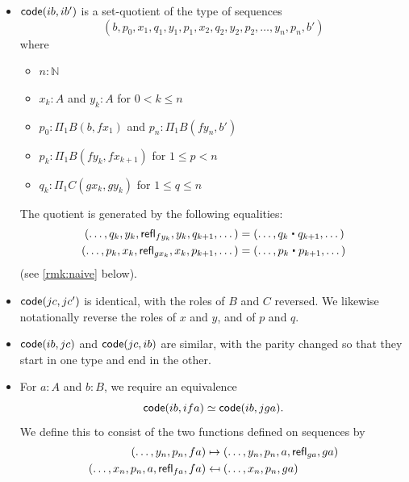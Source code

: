 \begin{itemize}
\item $\mathsf{code}(ib,ib')$ is a set-quotient of the type of sequences %
  \[ (b, p_0, x_1, q_1, y_1, p_1, x_2, q_2, y_2, p_2, \dots, y_n, p_n, b') \]
  where
  \begin{itemize}
  \item $n:\mathbb{N}$
  \item $x_k:A$ and $y_k:A$ for $0<k \le n$
  \item $p_0:\Pi_1B(b,f x_1)$ and $p_n:\Pi_1B(f y_n, b')$
  \item $p_k:\Pi_1B(f y_k, fx_{k+1})$ for $1\le p < n$
  \item $q_k:\Pi_1C(gx_k, gy_k)$ for $1\le q\le n$
  \end{itemize}
  The quotient is generated by the following equalities:
  \begin{alignat*}{2}
    (\dots, q_k, y_k, \refl{fy_k}, y_k, q_{k+1},\dots)
    &= (\dots, q_k\ct q_{k+1},\dots)\\
    (\dots, p_k, x_k, \refl{gx_k}, x_k, p_{k+1},\dots)
    &= (\dots, p_k\ct p_{k+1},\dots)
  \end{alignat*}
  (see \autoref{rmk:naive} below).
\item $\mathsf{code}(jc,jc')$ is identical, with the roles of $B$ and $C$ reversed.
  We likewise notationally reverse the roles of $x$ and $y$, and of $p$ and $q$.
\item $\mathsf{code}(ib,jc)$ and $\mathsf{code}(jc,ib)$ are similar, with the parity changed so that they start in one type and end in the other.
\item For $a:A$ and $b:B$, we require an equivalence
  \begin{equation}
    \code(ib, ifa) \simeq \code(ib,jga).\label{eq:bfa-bga}
  \end{equation}
  We define this to consist of the two functions defined on sequences by
  \begin{align*}
    (\dots, y_n, p_n,fa) &\mapsto (\dots,y_n,p_n,a,\mathsf{refl}_{ga},ga)\\
    (\dots, x_n, p_n, a, \mathsf{refl}_{fa}, fa) &\mapsfrom (\dots, x_n, p_n, ga)
  \end{align*}

\end{itemize}
